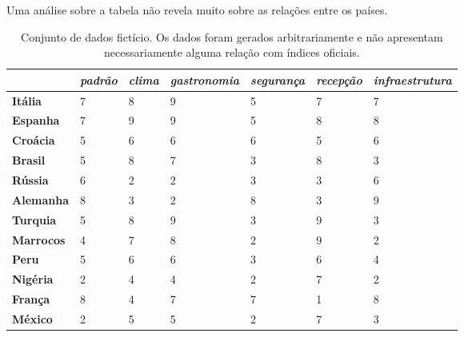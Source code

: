 Uma análise sobre a tabela não revela muito sobre as
relações entre os países. 

\begin{table}[htbp]
    \caption{Conjunto de dados fictício. Os dados foram
    gerados arbitrariamente e não apresentam necessariamente
    alguma relação com índices oficiais.}
    \begin{center}
        \begin{tabular}{|l|C{1.5cm}|C{1.5cm}|C{1.5cm}|C{1.5cm}|C{1.5cm}|C{1.5cm}|}
             & 
            \textbf{\textit{padrão}} & 
            \textbf{\textit{clima}} & 
            \textbf{\textit{gastronomia}} & 
            \textbf{\textit{segurança}} & 
            \textbf{\textit{recepção}} & 
            \textbf{\textit{infraestrutura}} \\ \hline
            \textbf{Itália} & 7 & 8 & 9 & 5 & 7 & 7 \\ \hline
            \textbf{Espanha} & 7 & 9 & 9 & 5 & 8 & 8 \\ \hline
            \textbf{Croácia} & 5 & 6 & 6 & 6 & 5 & 6 \\ \hline
            \textbf{Brasil} & 5 & 8 & 7 & 3 & 8 & 3 \\ \hline
            \textbf{Rússia} & 6 & 2 & 2 & 3 & 3 & 6 \\ \hline
            \textbf{Alemanha} & 8 & 3 & 2 & 8 & 3 & 9 \\ \hline
            \textbf{Turquia} & 5 & 8 & 9 & 3 & 9 & 3 \\ \hline
            \textbf{Marrocos} & 4 & 7 & 8 & 2 & 9 & 2 \\ \hline
            \textbf{Peru} & 5 & 6 & 6 & 3 & 6 & 4 \\ \hline
            \textbf{Nigéria} & 2 & 4 & 4 & 2 & 7 & 2 \\ \hline
            \textbf{França} & 8 & 4 & 7 & 7 & 1 & 8 \\ \hline
            \textbf{México} & 2 & 5 & 5 & 2 & 7 & 3 \\ \hline
        \end{tabular}
    \end{center}
    \label{tab:at}
\end{table}



